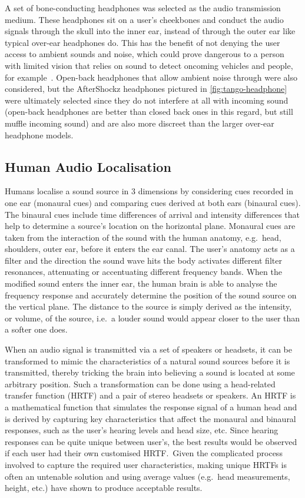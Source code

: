 \documentclass{llncs}
\begin{document}
A set of bone-conducting headphones was selected as the audio transmission medium.
These headphones sit on a user's cheekbones and conduct the audio signals through the skull into the inner ear, instead of through the outer ear like typical over-ear headphones do. 
This has the benefit of not denying the user access to ambient sounds and noise, which could prove dangerous to a person with limited vision that relies on sound to detect oncoming vehicles and people, for example~\cite{lichtenstein2012headphone}.
Open-back headphones that allow ambient noise through were also considered, but the AfterShockz headphones pictured in \cref{fig:tango-headphone} were ultimately selected since they do not interfere at all with incoming sound (open-back headphones are better than closed back ones in this regard, but still muffle incoming sound) and are also more discreet than the larger over-ear headphone models. 

\subsection{Human Audio Localisation}

Humans localise a sound source in 3 dimensions by considering cues recorded in one ear (monaural cues) and comparing cues derived at both ears (binaural cues)\cite{blauert1997spatial,blauert1969sound}.
The binaural cues include time differences of arrival and intensity differences that help to determine a source's location on the horizontal plane.
Monaural cues are taken from the interaction of the sound with the human anatomy, e.g.\ head, shoulders, outer ear, before it enters the ear canal.
The user's anatomy acts as a filter and the direction the sound wave hits the body activates different filter resonances, attenuating or accentuating different frequency bands.
When the modified sound enters the inner ear, the human brain is able to analyse the frequency response and accurately determine the position of the sound source on the vertical plane. 
The distance to the source is simply derived as the intensity, or volume, of the source, i.e.\ a louder sound would appear closer to the user than a softer one does. 

When an audio signal is transmitted via a set of speakers or headsets, it can be transformed to mimic the characteristics of a natural sound sources before it is transmitted, thereby tricking the brain into believing a sound is located at some arbitrary position.
Such a transformation can be done using a head-related transfer function (HRTF) and a pair of stereo headsets or speakers.
An HRTF is a mathematical function that simulates the response signal of a human head and is derived by capturing key characteristics that affect the monaural and binaural responses, such as the user's hearing levels and head size, etc.
Since hearing responses can be quite unique between user's, the best results would be observed if each user had their own customised HRTF.\
Given the complicated process involved to capture the required user characteristics, making unique HRTFs is often an untenable solution and using average values (e.g.\ head measurements, height, etc.) have shown to produce acceptable results.
\end{document}

